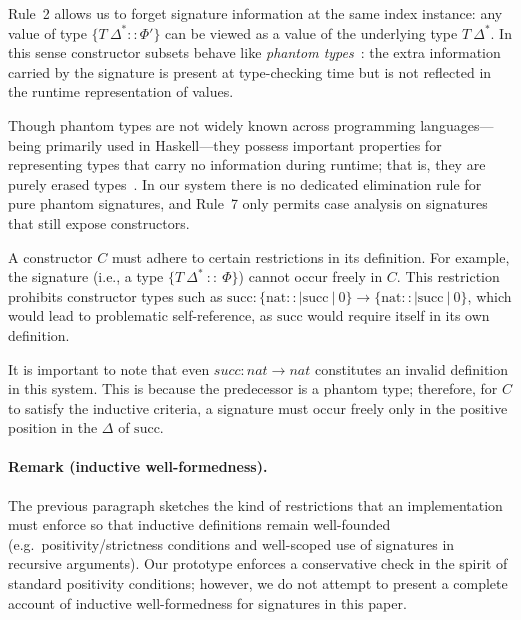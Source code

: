 \documentclass[a4paper, anonymous, UKenglish,cleveref, autoref, thm-restate]{lipics-v2021}
\begin{document}
Rule~2 allows us to forget signature information at the same index instance: any value of type $\{T\:\Delta^{*} :: \Phi' \}$ can be viewed as a value of the underlying type $T\:\Delta^{*}$. In this sense constructor subsets behave like \emph{phantom types}~\cite{fluet2005practical}: the extra information carried by the signature is present at type-checking time but is not reflected in the runtime representation of values.
	
Though phantom types are not widely known across programming languages—being primarily used in Haskell—they possess important properties for representing types that carry no information during runtime; that is, they are purely erased types~\cite{fluet2005practical}. In our system there is no dedicated elimination rule for pure phantom signatures, and Rule~7 only permits case analysis on signatures that still expose constructors.

A constructor $C$ must adhere to certain restrictions in its definition. For example, the signature (i.e., a type $\{T\:\Delta^* \:::\:\Phi\}$) cannot occur freely in $C$. This restriction prohibits constructor types such as $\text{succ}:\{\text{nat} :: |\text{succ}\:|\:0\} \rightarrow \{\text{nat} :: |\text{succ}\:|\:0\}$, which would lead to problematic self-reference, as $\text{succ}$ would require itself in its own definition.

It is important to note that even $succ: nat \rightarrow nat$ constitutes an invalid definition in this system. This is because the predecessor is a phantom type; therefore, for $C$ to satisfy the inductive criteria, a signature must occur freely only in the positive position in the $\Delta$ of $\text{succ}$.

\paragraph*{Remark (inductive well-formedness).}
The previous paragraph sketches the kind of restrictions that an implementation must enforce so that inductive definitions remain well-founded (e.g.\ positivity/strictness conditions and well-scoped use of signatures in recursive arguments). Our prototype enforces a conservative check in the spirit of standard positivity conditions; however, we do not attempt to present a complete account of inductive well-formedness for signatures in this paper.
\end{document}
